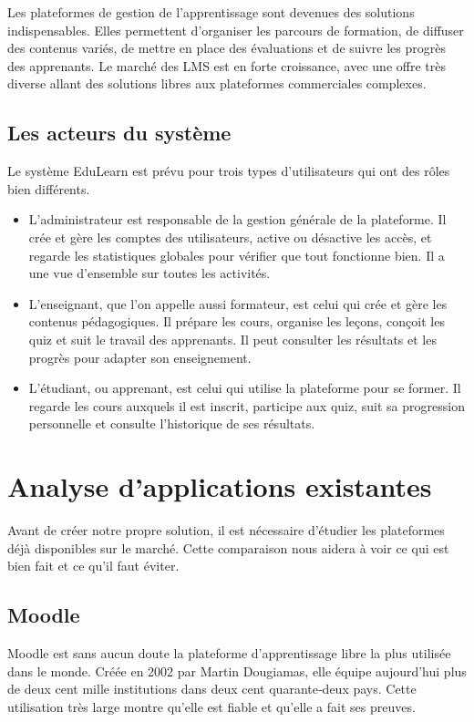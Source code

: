 \documentclass[12pt,a4paper]{report}
\begin{document}
Les plateformes de gestion de l'apprentissage sont devenues des solutions indispensables. Elles permettent d'organiser les parcours de formation, de diffuser des contenus variés, de mettre en place des évaluations et de suivre les progrès des apprenants. Le marché des LMS est en forte croissance, avec une offre très diverse allant des solutions libres aux plateformes commerciales complexes.

\subsection{Les acteurs du système}
Le système EduLearn est prévu pour trois types d'utilisateurs qui ont des rôles bien différents.

\begin{itemize}
    \item L'administrateur est responsable de la gestion générale de la plateforme. Il crée et gère les comptes des utilisateurs, active ou désactive les accès, et regarde les statistiques globales pour vérifier que tout fonctionne bien. Il a une vue d'ensemble sur toutes les activités.
    \item L'enseignant, que l'on appelle aussi formateur, est celui qui crée et gère les contenus pédagogiques. Il prépare les cours, organise les leçons, conçoit les quiz et suit le travail des apprenants. Il peut consulter les résultats et les progrès pour adapter son enseignement.
    \item L'étudiant, ou apprenant, est celui qui utilise la plateforme pour se former. Il regarde les cours auxquels il est inscrit, participe aux quiz, suit sa progression personnelle et consulte l'historique de ses résultats.
\end{itemize}

\section{Analyse d'applications existantes}
Avant de créer notre propre solution, il est nécessaire d'étudier les plateformes déjà disponibles sur le marché. Cette comparaison nous aidera à voir ce qui est bien fait et ce qu'il faut éviter.

\subsection{Moodle}
Moodle est sans aucun doute la plateforme d'apprentissage libre la plus utilisée dans le monde. Créée en 2002 par Martin Dougiamas, elle équipe aujourd'hui plus de deux cent mille institutions dans deux cent quarante‑deux pays. Cette utilisation très large montre qu'elle est fiable et qu'elle a fait ses preuves.
\end{document}
